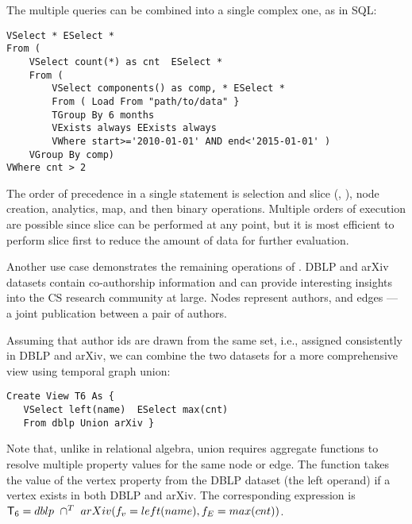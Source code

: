 The multiple queries can be combined into a single complex one, as in
SQL:

\begin{small}
\begin{verbatim}
VSelect * ESelect *
From (
    VSelect count(*) as cnt  ESelect *
    From (
        VSelect components() as comp, * ESelect *
        From ( Load From "path/to/data" }
        TGroup By 6 months
        VExists always EExists always
        VWhere start>='2010-01-01' AND end<'2015-01-01' )
    VGroup By comp)
VWhere cnt > 2 
\end{verbatim}
\end{small}

The order of precedence in a single statement is selection and slice
(, ), node creation, analytics, map, and
  then binary operations.  Multiple orders of execution are possible
  since slice can be performed at any point, but it is most efficient
  to perform slice first to reduce the amount of data for further
  evaluation.

Another use case demonstrates the remaining operations of \tga.  DBLP
and arXiv datasets contain co-authorship information and can provide
interesting insights into the CS research community at large.  Nodes
represent authors, and edges --- a joint publication between a pair of
authors.

\begin{example}
\label{ex:union}

Assuming that author ids are drawn from the same set, i.e., assigned
consistently in DBLP and arXiv, we can combine the two datasets for a
more comprehensive view using temporal graph union:

\begin{small}
\begin{verbatim}
Create View T6 As {
   VSelect left(name)  ESelect max(cnt)
   From dblp Union arXiv }
\end{verbatim}
\end{small}

Note that, unlike in relational algebra, \tga union requires aggregate
functions to resolve multiple property values for the same node or
edge.  The  function takes the value of the vertex
property  from the DBLP dataset (the left operand) if a
vertex exists in both DBLP and arXiv. The corresponding \tga
expression is $\mathsf{T}_6 = dblp~\cap^T~arXiv(f_v=left(name),f_E=max(cnt))$.

\end{example}

